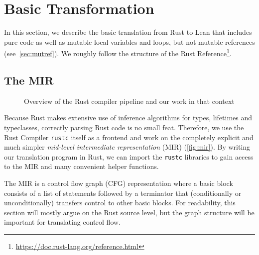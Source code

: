 \section{Basic Transformation}
\label{sec:trans}

In this section, we describe the basic translation from Rust to Lean that
includes pure code as well as mutable local variables and loops, but not mutable
references (see~\autoref{sec:mutref}). We roughly follow the structure of the
Rust Reference\footnote{\url{https://doc.rust-lang.org/reference.html}}.

\subsection{The MIR}

\begin{figure}[!bp]
  \centering
  \caption{Overview of the Rust compiler pipeline and our work in that context}
  \label{fig:mir}
\end{figure}

Because Rust makes extensive use of inference algorithms for types, lifetimes and typeclasses,
correctly parsing Rust code is no small feat. Therefore, we use the Rust
Compiler \texttt{rustc} itself as a frontend and work on the completely explicit and
much simpler \emph{mid-level intermediate representation} (MIR)
(\autoref{fig:mir}). By writing our translation program in Rust, we can import
the \texttt{rustc} libraries to gain access to the MIR and many convenient
helper functions.

The MIR is a control flow graph (CFG) representation where a basic block consists
of a list of statements followed by a terminator that (conditionally or
unconditionally) transfers control to other basic blocks. For readability,
this section will mostly argue on the Rust source level, but the graph structure
will be important for translating control flow.

